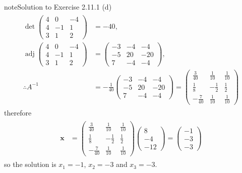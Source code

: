 \documentclass[letterpaper,10pt,english]{jupyterBook}
\begin{document}
\begin{sphinxadmonition}{note}{Solution to Exercise 2.11.1}
\sphinxAtStartPar
(d)
\begin{equation*}
\begin{split} \begin{align*}
    \det\left(\begin{matrix}4 & 0 & -4\\4 & -1 & 1\\3 & 1 & 2\end{matrix}\right) &= -40, \\ 
    \operatorname{adj}\left(\begin{matrix}4 & 0 & -4\\4 & -1 & 1\\3 & 1 & 2\end{matrix}\right) &= \left(\begin{matrix}-3 & -4 & -4\\-5 & 20 & -20\\7 & -4 & -4\end{matrix}\right), \\ 
    \therefore A^{-1} &= - \frac{1}{40}\left(\begin{matrix}-3 & -4 & -4\\-5 & 20 & -20\\7 & -4 & -4\end{matrix}\right) = \left(\begin{matrix}\frac{3}{40} & \frac{1}{10} & \frac{1}{10}\\\frac{1}{8} & - \frac{1}{2} & \frac{1}{2}\\- \frac{7}{40} & \frac{1}{10} & \frac{1}{10}\end{matrix}\right) 
\end{align*} \end{split}
\end{equation*}
\sphinxAtStartPar
therefore
\begin{equation*}
\begin{split}\begin{align*}
    \mathbf{x} &= \left(\begin{matrix}\frac{3}{40} & \frac{1}{10} & \frac{1}{10}\\\frac{1}{8} & - \frac{1}{2} & \frac{1}{2}\\- \frac{7}{40} & \frac{1}{10} & \frac{1}{10}\end{matrix}\right)
    \left(\begin{matrix}8\\-4\\-12\end{matrix}\right) = 
    \left(\begin{matrix}-1\\-3\\-3\end{matrix}\right)
\end{align*} \end{split}
\end{equation*}
\sphinxAtStartPar
so the solution is \(x_1 = -1\), \(x_2 = -3\) and \(x_3 = -3\).
\end{sphinxadmonition}
 \label{_pages/A2_Linear_systems_exercises_solutions:_pages/A2_Linear_systems_exercises_solutions-solution-1}
\end{document}
